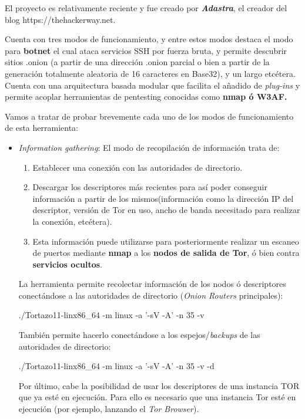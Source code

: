 El proyecto es relativamente reciente y fue creado por
\textbf{\textit{Adastra}}, el creador del blog
https://thehackerway.net.

Cuenta con tres modos de funcionamiento, y entre estos modos destaca
el modo para \textbf{botnet} el cual ataca servicios SSH por fuerza
bruta, y permite descubrir sitios .onion (a partir de una dirección
.onion parcial o bien a partir de la generación totalmente aleatoria
de 16 caracteres en Base32), y un largo etcétera. Cuenta con una
arquitectura basada modular que facilita el añadido de
\textit{plug-ins} y permite acoplar herramientas de pentesting
conocidas como \textbf{nmap ó W3AF.}

Vamos a tratar de probar brevemente cada uno de los modos de
funcionamiento de esta herramienta:

\begin{itemize}
	\item{\textit{Information gathering}}: El modo de recopilación de información trata de:
	\begin{enumerate}
		\item Establecer una conexión con las autoridades de directorio.
		\item Descargar los descriptores más recientes para así poder conseguir información a partir de los mismos(información como  la dirección IP del descriptor, versión de Tor en uso, ancho de banda necesitado para realizar la conexión, etcétera). 
		\item Esta información puede utilizarse para posteriormente realizar un escaneo de puertos mediante \textbf{nmap} a los \textbf{nodos de salida de Tor}, ó bien contra \textbf{servicios ocultos}. 
	\end{enumerate}
	
	La herramienta permite recolectar información de los nodos ó descriptores conectándose a las autoridades de directorio (\textit{Onion Routers} principales):
	
	{\selectfont 
		./Tortazo11-linx86\_64 -m linux -a '-sV -A' -n 35 -v
	}
	
	También permite hacerlo conectándose a los espejos/\textit{backups} de las autoridades de directorio:
	
	{\selectfont 
		./Tortazo11-linx86\_64 -m linux -a '-sV -A' -n 35 -v -d
	}
	
	Por último, cabe la posibilidad de usar los descriptores de una instancia TOR que ya esté en ejecución. Para ello es necesario que una instancia Tor esté en ejecución (por ejemplo, lanzando el \textit{Tor Browser}).
	

\end{itemize}
